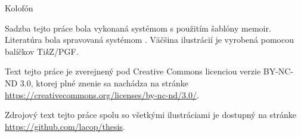 \clearpage
\pagestyle{empty}
\null\vfil

\begin{adjustwidth}{2cm}{2cm}
\begin{center}
{\Large\textsf{Kolofón}}
\end{center}
\noindent Sadzba tejto práce bola vykonaná systémom \textsf{\XeLaTeX} s použitím šablóny \textsf{memoir}. Literatúra bola spravovaná systémom \textsf{\BibTeX}. Väčšina ilustrácií je vyrobená pomocou balíčkov \textsf{Ti\textit{k}Z/PGF}. 

\vspace{1cm}

\begin{center}
\ccbyncndeu
\end{center}

\noindent Text tejto práce je zverejnený pod \textsf{Creative Commons} licenciou verzie \textsf{BY-NC-ND 3.0}, ktorej plné znenie sa nachádza na stránke \url{https://creativecommons.org/licenses/by-nc-nd/3.0/}.

\vspace{1cm}

\noindent Zdrojový text tejto práce spolu so všetkými ilustráciami je dostupný na stránke \url{https://github.com/lacop/thesis}.

\end{adjustwidth}

\vfil
